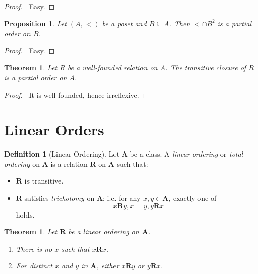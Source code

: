 \documentclass{report}
\let\qed\relax
\newtheorem{proposition}[axiom]{Proposition}
\newtheorem{theorem}[axiom]{Theorem}
\theoremstyle{definition}
\newtheorem{definition}[axiom]{Definition}
\begin{document}
    \begin{proof}
        \pf\ Easy. \qed
    \end{proof}

    \begin{proposition}
        Let $(A, <)$ be a poset and $B \subseteq A$. Then $< \cap B^2$ is a partial order on $B$.
    \end{proposition}

    \begin{proof}
        \pf\ Easy. \qed
    \end{proof}

    \begin{theorem}
        Let $R$ be a well-founded relation on $A$. The transitive closure of $R$ is a partial order on $A$.
    \end{theorem}

    \begin{proof}
        \pf\ It is well founded, hence irreflexive. \qed
    \end{proof}

    \section{Linear Orders}

    \begin{definition}[Linear Ordering]
        Let $\mathbf{A}$ be a class. A \emph{linear ordering} or \emph{total ordering} on $\mathbf{A}$
        is a relation $\mathbf{R}$ on $\mathbf{A}$ such that:
        \begin{itemize}
            \item $\mathbf{R}$ is transitive.
            \item $\mathbf{R}$ satisfies \emph{trichotomy} on $\mathbf{A}$; i.e. for any $x, y \in \mathbf{A}$,
            exactly one of
            \[ x\mathbf{R}y, x=y, y\mathbf{R}x \]
            holds.
        \end{itemize}
    \end{definition}

    \begin{theorem}
        Let $\mathbf{R}$ be a linear ordering on $\mathbf{A}$.
        \begin{enumerate}
            \item There is no $x$ such that $x \mathbf{R} x$.
            \item For distinct $x$ and $y$ in $\mathbf{A}$, either $x\mathbf{R}y$ or $y\mathbf{R}x$.
        \end{enumerate}
    \end{theorem}
\end{document}
